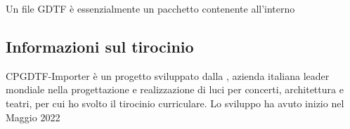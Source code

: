 \documentclass[main.tex]{subfiles}
\begin{document}
Un file GDTF è essenzialmente un pacchetto contenente all'interno 

\subsection{Informazioni sul tirocinio}\label{subsec:tirocinio}
CPGDTF-Importer è un progetto sviluppato dalla , azienda italiana leader mondiale nella progettazione e realizzazione di luci per concerti, architettura e teatri, per cui ho svolto il tirocinio curriculare. Lo sviluppo ha avuto inizio nel Maggio 2022 
\end{document}

